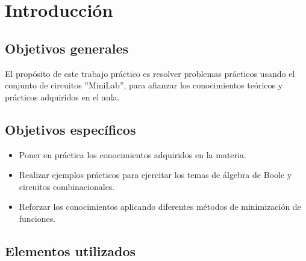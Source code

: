 \section{Introducción}
\subsection{Objetivos generales}
\sangria{} El propósito de este trabajo práctico es resolver problemas prácticos usando el conjunto de circuitos ''MiniLab'', para afianzar los conocimientos teóricos y prácticos adquiridos en el aula.

\subsection{Objetivos específicos}
\begin{itemize}
    \item Poner en práctica los conocimientos adquiridos en la materia.
    \item Realizar ejemplos prácticos para ejercitar los temas de álgebra de Boole y circuitos combinacionales.
    \item Reforzar los conocimientos aplicando diferentes métodos de minimización de funciones.
\end{itemize}

\subsection{Elementos utilizados}
